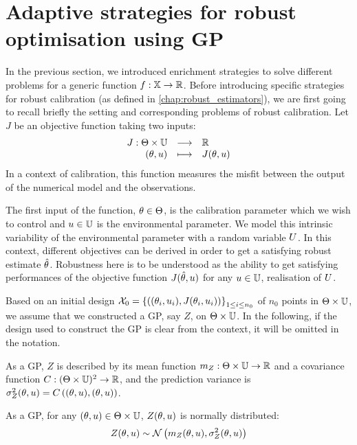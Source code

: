 \documentclass[../../Main_ManuscritThese.tex]{subfiles}
\begin{document}
\section{Adaptive strategies for robust optimisation using GP}
\label{sec:robust_criteria_gp}
In the previous section, we introduced enrichment strategies to solve
different problems for a generic function
$f:\mathbb{X}\rightarrow \mathbb{R}$.  Before introducing specific
strategies for robust calibration (as defined in
\cref{chap:robust_estimators}), we are first going to recall briefly
the setting and corresponding problems of robust calibration.  Let $J$
be an objective function taking two inputs:
\begin{equation}
  \begin{array}{rcl}
    J: \Theta \times \mathbb{U}& \longrightarrow& \mathbb{R} \\
    (\theta, u) & \longmapsto & J(\theta, u)
  \end{array}
\end{equation}
In a context of calibration, this function measures the misfit between
the output of the numerical model and the observations.

The first input of the function, $\theta\in\Theta$, is the calibration
parameter which we wish to control and $u\in\mathbb{U}$ is the
environmental parameter. We model this intrinsic variability of the
environmental parameter with a random variable $U$.  In this
context, different objectives can be derived in order to get a
satisfying robust estimate $\hat{\theta}$. Robustness here is to be understood as
the ability to get satisfying performances of the objective function
$J(\hat{\theta},u)$ for any $u\in\mathbb{U}$, realisation of $U$.

Based on an initial design
$\mathcal{X}_0 = \left\{\left((\theta_i,u_i),J(\theta_i, u_i)
  \right)\right\}_{1\leq i \leq n_0}$ of $n_0$ points in
$\Theta\times\mathbb{U}$, we assume that we constructed a GP, say $Z$, on
$\Theta \times \mathbb{U}$. In the following, if the design used to
construct the GP is clear from the context, it will be omitted in the
notation.

As a GP, $Z$ is described by its mean function
$m_{Z}:\Theta \times \mathbb{U}\rightarrow\mathbb{R}$ and a covariance
function $C:(\Theta\times\mathbb{U})^2\rightarrow \mathbb{R}$, and the
prediction variance is
$\sigma^2_Z(\theta,u) = C\left((\theta,u), (\theta,u)\right)$.

As a GP, for any $(\theta, u)\in\Theta\times\mathbb{U}$, $Z(\theta, u)$ is normally distributed:
\begin{equation}
  Z(\theta,u) \sim \mathcal{N}\left(m_{Z}(\theta,u), \sigma^2_Z(\theta,u) \right)
\end{equation}
\end{document}
